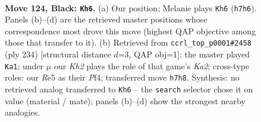 \documentclass[11pt]{article}
\begin{document}
\begin{figure}[p]\centering
\begin{subfigure}{0.46\textwidth}\centering
\resizebox{\linewidth}{!}{%
\newchessgame
\chessboard[
  setfen={8/5K1k/8/4r3/8/8/8/8 b - - 33 124},
  showmover=false,
  pgfstyle=straightmove, color=movearrow, markmove={h7-h6}
]}
\caption{}
\end{subfigure}\hfill
\begin{subfigure}{0.46\textwidth}\centering
\resizebox{\linewidth}{!}{%
\newchessgame
\chessboard[
  setfen={8/8/8/8/1k3P2/8/K7/8 w - - 6 118},
  showmover=false,
  pgfstyle=straightmove, color=movearrow, markmove={a2-a1}
]}
\caption{}
\end{subfigure}
\\[4pt]

\caption{\textbf{Move 124, Black: \texttt{Kh6}.} (a) Our position; Melanie plays \texttt{Kh6} (\texttt{h7h6}). Panels (b)--(d) are the retrieved master positions whose correspondence most drove this move (highest QAP objective among those that transfer to it). (b) Retrieved from \texttt{ccrl\_top\_p0001\#2458} (ply 234) [structural distance $d$=3, QAP obj=1]: the master played \texttt{Ka1}; under $\mu$ our \emph{Kh2} plays the role of that game's \emph{Ka2}; cross-type roles: our \emph{R}e5 as their \emph{P}f4; transferred move \texttt{h7h8}. Synthesis: no retrieved analog transferred to \texttt{Kh6} -- the \texttt{search} selector chose it on value (material / mate); panels (b)--(d) show the strongest nearby analogies.}
\label{fig:thought-m247}
\end{figure}

\clearpage
\end{document}
